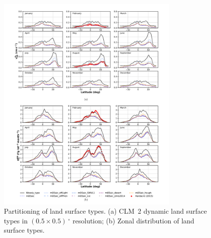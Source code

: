 \documentclass[gmd, manuscript]{copernicus}
\begin{document}
\appendixfigures
\begin{figure}[!htbp]
  \centering
  \includegraphics[width=0.8\textwidth]{fig10}
  \caption{Partitioning of land surface types. (a) CLM~2 dynamic land surface types in $(0.5\times0.5)\,\unit{^\circ}$ resolution; (b) Zonal distribution of land surface types.}
  \label{fig:pft_landsurface}
\end{figure}



\noappendix       %



\end{document}
